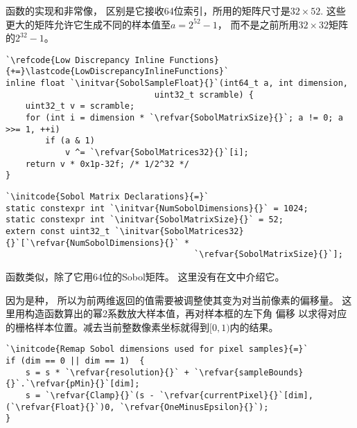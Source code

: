 函数的实现和非常像，
区别是它接收64位索引，所用的矩阵尺寸是$32\times52$.
这些更大的矩阵允许它生成不同的样本值至$a=2^{52}-1$，
而不是之前所用$32\times32$矩阵的$2^{32}-1$。
\begin{lstlisting}
`\refcode{Low Discrepancy Inline Functions}{+=}\lastcode{LowDiscrepancyInlineFunctions}`
inline float `\initvar{SobolSampleFloat}{}`(int64_t a, int dimension,
                              uint32_t scramble) {
    uint32_t v = scramble;
    for (int i = dimension * `\refvar{SobolMatrixSize}{}`; a != 0; a >>= 1, ++i)
        if (a & 1)
            v ^= `\refvar{SobolMatrices32}{}`[i];
    return v * 0x1p-32f; /* 1/2^32 */
}
\end{lstlisting}
\begin{lstlisting}
`\initcode{Sobol Matrix Declarations}{=}`
static constexpr int `\initvar{NumSobolDimensions}{}` = 1024;
static constexpr int `\initvar{SobolMatrixSize}{}` = 52;
extern const uint32_t `\initvar{SobolMatrices32}{}`[`\refvar{NumSobolDimensions}{}` *
                                      `\refvar{SobolMatrixSize}{}`];
\end{lstlisting}

函数{}类似，除了它用64位的Sobol矩阵。
这里没有在文中介绍它。

因为是种，
所以为前两维返回的值需要被调整使其变为对当前像素的偏移量。
这里用构造函数算出的幂2系数放大样本值，再对样本框的左下角
偏移
以求得对应的栅格样本位置。减去当前整数像素坐标就得到$[0,1)$内的结果。
\begin{lstlisting}
`\initcode{Remap Sobol dimensions used for pixel samples}{=}`
if (dim == 0 || dim == 1)  {
    s = s * `\refvar{resolution}{}` + `\refvar{sampleBounds}{}`.`\refvar{pMin}{}`[dim];
    s = `\refvar{Clamp}{}`(s - `\refvar{currentPixel}{}`[dim], (`\refvar{Float}{}`)0, `\refvar{OneMinusEpsilon}{}`);
}
\end{lstlisting}